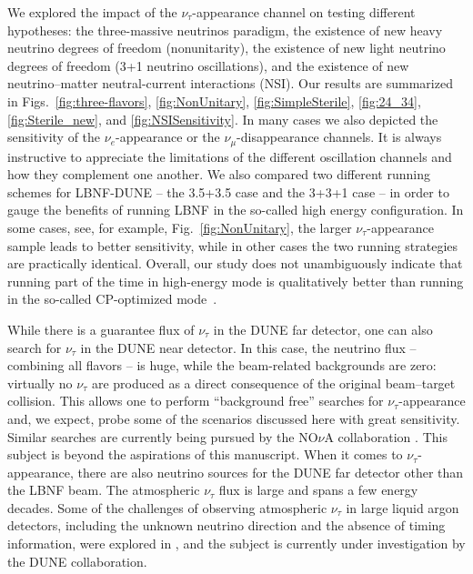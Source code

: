 \documentclass[aps,prd,onecolumn,nofootinbib,superscriptaddress, 11pt]{revtex4}
\begin{document}
We explored the impact of the $\nu_{\tau}$-appearance channel on testing different hypotheses: the three-massive neutrinos paradigm, the existence of new heavy neutrino degrees of freedom (nonunitarity), the existence of new light neutrino degrees of freedom (3+1 neutrino oscillations), and the existence of new neutrino--matter neutral-current interactions (NSI). Our results are summarized in Figs.~\ref{fig:three-flavors}, \ref{fig:NonUnitary}, \ref{fig:SimpleSterile}, \ref{fig:24_34}, \ref{fig:Sterile_new}, and \ref{fig:NSISensitivity}. In many cases we also depicted the sensitivity of the $\nu_{e}$-appearance or the $\nu_{\mu}$-disappearance channels. It is always instructive to appreciate the limitations of the different oscillation channels and how they complement one another. We also compared two different running schemes for LBNF-DUNE -- the 3.5+3.5 case and the 3+3+1 case -- in order to gauge the benefits of running LBNF in the so-called high energy configuration. In some cases, see, for example, Fig.~\ref{fig:NonUnitary}, the larger $\nu_{\tau}$-appearance sample leads to better sensitivity, while in other cases the two running strategies are practically identical. Overall, our study does not unambiguously indicate that running part of the time in high-energy mode is qualitatively better than running in the so-called CP-optimized mode~\cite{LauraFlux,Acciarri:2015uup}.  

While there is a guarantee flux of $\nu_{\tau}$ in the DUNE far detector, one can also search for $\nu_{\tau}$ in the DUNE near detector. In this case, the neutrino flux -- combining all flavors -- is huge, while the beam-related backgrounds are zero: virtually no $\nu_{\tau}$ are produced as a direct consequence of the original beam--target collision. This allows one to perform ``background free'' searches for $\nu_{\tau}$-appearance and, we expect, probe some of the scenarios discussed here with great sensitivity. Similar searches are currently being pursued by the NO$\nu$A collaboration \cite{ Keloth:2017vdp}. This subject is beyond the aspirations of this manuscript. When it comes to $\nu_{\tau}$-appearance, there are also neutrino sources for the DUNE far detector other than the LBNF beam. The atmospheric $\nu_{\tau}$ flux is large and spans a few energy decades. Some of the challenges of observing atmospheric $\nu_{\tau}$ in large liquid argon detectors, including the unknown neutrino direction and the absence of timing information, were explored in \cite{Conrad:2010mh}, and the subject is currently under investigation by the DUNE collaboration. 
\end{document}
